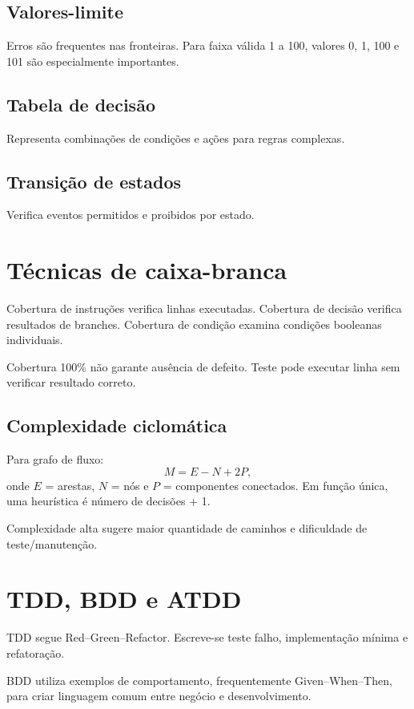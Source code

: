 \subsection{Valores-limite}

Erros são frequentes nas fronteiras. Para faixa válida 1 a 100, valores 0, 1, 100 e 101 são especialmente importantes.

\subsection{Tabela de decisão}

Representa combinações de condições e ações para regras complexas.

\subsection{Transição de estados}

Verifica eventos permitidos e proibidos por estado.

\section{Técnicas de caixa-branca}

Cobertura de instruções verifica linhas executadas. Cobertura de decisão verifica resultados de branches. Cobertura de condição examina condições booleanas individuais.

Cobertura 100\% não garante ausência de defeito. Teste pode executar linha sem verificar resultado correto.

\subsection{Complexidade ciclomática}

Para grafo de fluxo:
\[
M=E-N+2P,
\]
onde $E$ = arestas, $N$ = nós e $P$ = componentes conectados. Em função única, uma heurística é número de decisões + 1.

Complexidade alta sugere maior quantidade de caminhos e dificuldade de teste/manutenção.

\section{TDD, BDD e ATDD}

TDD segue Red--Green--Refactor. Escreve-se teste falho, implementação mínima e refatoração.

BDD utiliza exemplos de comportamento, frequentemente Given--When--Then, para criar linguagem comum entre negócio e desenvolvimento.

